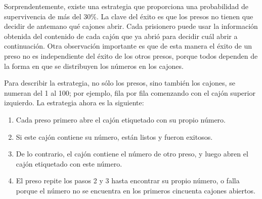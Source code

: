 Sorprendentemente, existe una estrategia que proporciona una probabilidad de supervivencia de más del 30\%. La clave del éxito es que los presos no tienen que decidir de antemano qué cajones abrir. Cada prisionero puede usar la información obtenida del contenido de cada cajón que ya abrió para decidir cuál abrir a continuación. Otra observación importante es que de esta manera el éxito de un preso no es independiente del éxito de los otros presos, porque todos dependen de la forma en que se distribuyen los números en los cajones\cite{curtin2006locker}.

Para describir la estrategia, no sólo los presos, sino también los cajones, se numeran del 1 al 100; por ejemplo, fila por fila comenzando con el cajón superior izquierdo. La estrategia ahora es la siguiente:
\begin{enumerate}
\item Cada preso primero abre el cajón etiquetado con su propio número.
\item Si este cajón contiene su número, están listos y fueron exitosos.
\item De lo contrario, el cajón contiene el número de otro preso, y luego abren el cajón etiquetado con este número.
\item El preso repite los pasos 2 y 3 hasta encontrar su propio número, o falla porque el número no se encuentra en los primeros cincuenta cajones abiertos.
\end{enumerate}